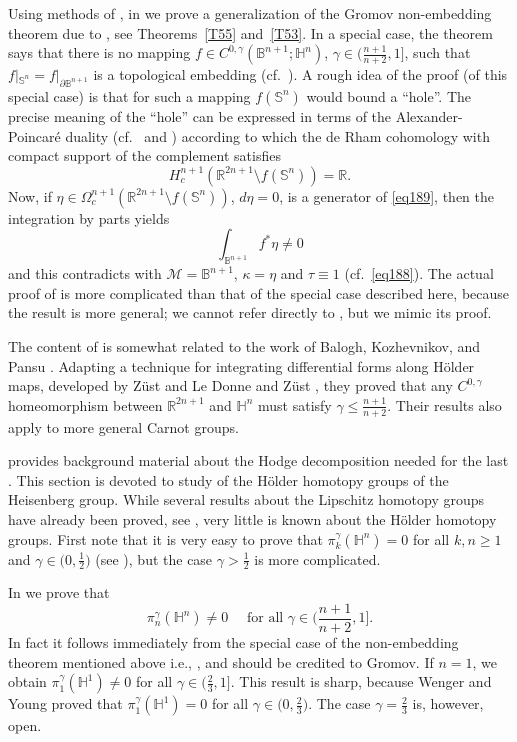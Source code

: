\documentclass[intlimits,12pt,reqno]{amsart}
\newcommand{\cM}{\mathcal M}
\newcommand{\Sph}{\mathbb S}
\newcommand{\bbbb}{\mathbb B}
\newcommand{\bbbh}{\mathbb H}
\newcommand{\R}{\mathbb R}
\numberwithin{equation}{section}
\theoremstyle{definition}
\begin{document}
Using methods of , in  we prove a generalization of the Gromov non-embedding theorem \cite[3.1.A]{gromov2} due to \cite{HS23}, see Theorems~\ref{T55} and~\ref{T53}. In a special case, the theorem says that there is no mapping $f\in C^{0,\gamma}(\bbbb^{n+1};\bbbh^n)$, $\gamma\in\big(\frac{n+1}{n+2},1\big]$, such that $f|_{\Sph^n}=f|_{\partial\bbbb^{n+1}}$ is a topological embedding (cf.\ ). A rough idea of the proof (of this special case) is that for such a mapping $f(\Sph^n)$ would bound a ``hole''. The precise meaning of the ``hole'' can be expressed in terms of the Alexander-Poincar\'e duality (cf.\  and ) according to which the de Rham cohomology with compact support of the complement satisfies
\begin{equation}
\label{eq189}
H_c^{n+1}(\R^{2n+1}\setminus f(\Sph^n))=\R.
\end{equation}
Now, if $\eta\in\Omega_c^{n+1}(\R^{2n+1}\setminus f(\Sph^n))$, $d\eta=0$, is a generator of \eqref{eq189}, then the integration by parts yields 
$$
\int_{\bbbb^{n+1}} f^*\eta\neq 0
$$
and this contradicts  with  $\cM=\bbbb^{n+1}$, $\kappa=\eta$ and $\tau\equiv 1$ (cf.\ \eqref{eq188}). The actual proof of  is more complicated than that of the special case described here, 
because the result is more general; we cannot refer directly to , but we mimic its proof.

The content of  is somewhat related to the work of Balogh, Kozhevnikov, and Pansu \cite{BKP}. Adapting a technique for integrating differential forms along H\"older maps, developed by Z\"ust \cite{zust2,zust1} and Le Donne and Z\"ust \cite{LZ}, they proved that any $C^{0,\gamma}$ homeomorphism between $\R^{2n+1}$ and $\bbbh^n$ must satisfy $\gamma\leq\frac{n+1}{n+2}$. Their results also apply to more general Carnot groups.




 provides background material about the Hodge decomposition needed for the last . This section is devoted to study of the H\"older homotopy groups of the Heisenberg group. While several results about the Lipschitz homotopy groups have already been proved, see , very little is known about the H\"older homotopy groups. 
First note that it is very easy to prove that $\pi_k^\gamma(\bbbh^n)=0$ for all $k,n\geq 1$ and $\gamma\in\big(0,\frac{1}{2}\big)$ (see ), but the case $\gamma>\frac{1}{2}$ is more complicated.

In  we prove that
$$
\pi_n^\gamma(\bbbh^n)\neq 0
\quad 
\text{ for all  }{\textstyle \gamma\in \big(\frac{n+1}{n+2},1\big]}.
$$
In fact it follows immediately from the special case of the non-embedding theorem mentioned above i.e., , and  should be credited to Gromov. If $n=1$, we obtain $\pi_1^\gamma(\bbbh^1)\neq 0$ for all $\gamma\in \big(\frac{2}{3},1\big]$. This result is sharp, because Wenger and Young \cite[Theorem~1.1]{wengerYoung18} proved that $\pi_1^\gamma(\bbbh^1)=0$ for all $\gamma\in\big(0,\frac{2}{3}\big)$. The case $\gamma=\frac{2}{3}$ is, however, open.
\end{document}
